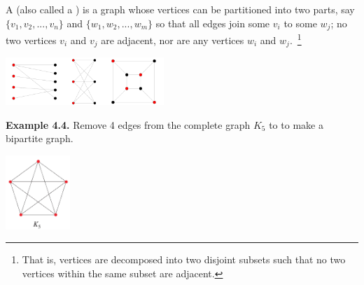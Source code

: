 \documentclass[aspectratio=169]{beamer}
\begin{document}
%

\begin{frame}[plain]{}
 
  A  (also called a )
   is a graph whose vertices can be partitioned into two
   parts, say $\{v_1, v_2,..., v_n\}$ and $\{w_1, w_2,..., w_m\}$
    so that all edges join some $v_i$ to some $w_j$;
    no two vertices $v_i$ and $v_j$ are adjacent, 
    nor are any vertices $w_i$ and $w_j$.~\footnote{That is,
    vertices are decomposed into two disjoint subsets 
    such that no two vertices within the same subset are adjacent.}
     
    \begin{center}
         \includegraphics[height=1.8cm]{./img/lecture4-fig4.png}
       \end{center}
       \pause
       
  {\bf Example 4.4.} Remove 4 edges from the complete graph $K_5$ to
     to  make a bipartite graph.
 
  \begin{center}
    \includegraphics[height=2.8cm]{./img/lecture4-fig5.png}
  \end{center}
   
  
 \end{frame}
 
\end{document}
